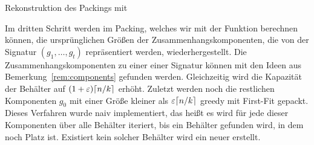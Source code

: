 \begin{algorithm}
    \caption{Rekonstruktion des Packings mit }
    \label{alg:bapa}
    \begin{algorithmic}[1]
             
                 
            \EndFor
        \EndFunction
    \end{algorithmic}
\end{algorithm}

Im dritten Schritt werden im Packing, welches wir mit der Funktion  berechnen können, die ursprünglichen Größen der Zusammenhangskomponenten, die von der Signatur $(g_1, \ldots, g_t)$ repräsentiert werden, wiederhergestellt. 
Die Zusammenhangskomponenten zu einer einer Signatur können mit den Ideen aus Bemerkung~\ref{rem:components} gefunden werden.
Gleichzeitig wird die Kapazität der Behälter auf $(1+\varepsilon)\lceil n/k\rceil$ erhöht.
Zuletzt werden noch die restlichen Komponenten $g_0$ mit einer Größe kleiner als $\varepsilon \lceil n/k\rceil$ greedy mit First-Fit gepackt.
Dieses Verfahren wurde naiv implementiert, das heißt es wird für jede dieser Komponenten über alle Behälter iteriert, bis ein Behälter gefunden wird, in dem noch Platz ist.
Existiert kein solcher Behälter wird ein neuer erstellt.

